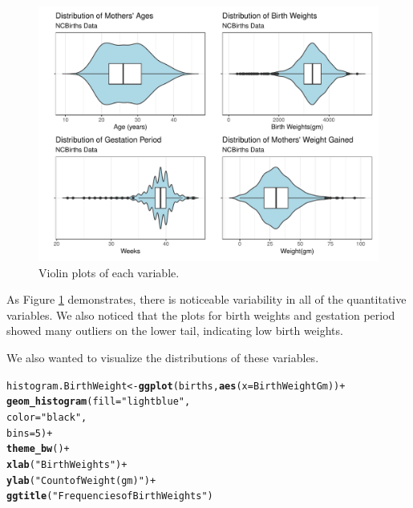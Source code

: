 \documentclass{article}\usepackage[]{graphicx}\usepackage[]{xcolor}
\makeatletter
\def\maxwidth{ %
  \ifdim\Gin@nat@width>\linewidth
    \linewidth
  \else
    \Gin@nat@width
  \fi
}
\newcommand{\hlnum}[1]{\textcolor[rgb]{0.686,0.059,0.569}{#1}}%
\newcommand{\hlstr}[1]{\textcolor[rgb]{0.192,0.494,0.8}{#1}}%
\newcommand{\hlopt}[1]{\textcolor[rgb]{0,0,0}{#1}}%
\newcommand{\hlstd}[1]{\textcolor[rgb]{0.345,0.345,0.345}{#1}}%
\newcommand{\hlkwb}[1]{\textcolor[rgb]{0.69,0.353,0.396}{#1}}%
\newcommand{\hlkwc}[1]{\textcolor[rgb]{0.333,0.667,0.333}{#1}}%
\newcommand{\hlkwd}[1]{\textcolor[rgb]{0.737,0.353,0.396}{\textbf{#1}}}%
\newenvironment{kframe}{%
 \def\at@end@of@kframe{}%
 \ifinner\ifhmode%
  \def\at@end@of@kframe{\end{minipage}}%
  \begin{minipage}{\columnwidth}%
 \fi\fi%
 \def\FrameCommand##1{\hskip\@totalleftmargin \hskip-\fboxsep
 \colorbox{shadecolor}{##1}\hskip-\fboxsep
     \hskip-\linewidth \hskip-\@totalleftmargin \hskip\columnwidth}%
 \MakeFramed {\advance\hsize-\width
   \@totalleftmargin\z@ \linewidth\hsize
   \@setminipage}}%
 {\par\unskip\endMakeFramed%
 \at@end@of@kframe}
\newenvironment{knitrout}{}{} %
\makeatother
\begin{document}
\begin{enumerate}[a.]
\begin{figure}[H]
\centering
\begin{knitrout}
\color{fgcolor}
\includegraphics[width=\maxwidth]{figure/unnamed-chunk-3-1} 
\end{knitrout}
\caption{Violin plots of each variable.}
\label{ViolinSummary}
\end{figure}

As Figure \ref{ViolinSummary} demonstrates, there is noticeable variability in all of the quantitative variables. We also noticed that the plots for birth weights and gestation period showed many outliers on the lower tail, indicating low birth weights. 

We also wanted to visualize the distributions of these variables.

\begin{knitrout}
\color{fgcolor}\begin{kframe}
\begin{alltt}
\hlstd{histogram.BirthWeight}\hlkwb{<-} \hlkwd{ggplot}\hlstd{(births,} \hlkwd{aes}\hlstd{(}\hlkwc{x}\hlstd{=BirthWeightGm))}\hlopt{+}
  \hlkwd{geom_histogram}\hlstd{(}\hlkwc{fill} \hlstd{=} \hlstr{"lightblue"}\hlstd{,}
                 \hlkwc{color} \hlstd{=} \hlstr{"black"}\hlstd{,}
                 \hlkwc{bins} \hlstd{=} \hlnum{5}\hlstd{)} \hlopt{+}
  \hlkwd{theme_bw}\hlstd{()} \hlopt{+}
  \hlkwd{xlab}\hlstd{(}\hlstr{"Birth Weights"}\hlstd{)}\hlopt{+}
  \hlkwd{ylab}\hlstd{(}\hlstr{"Count of Weight(gm)"}\hlstd{)}\hlopt{+}
  \hlkwd{ggtitle}\hlstd{(}\hlstr{"Frequencies of Birth Weights"}\hlstd{)}



\end{alltt}
\end{kframe}
\end{knitrout}
\end{enumerate}
\end{document}
